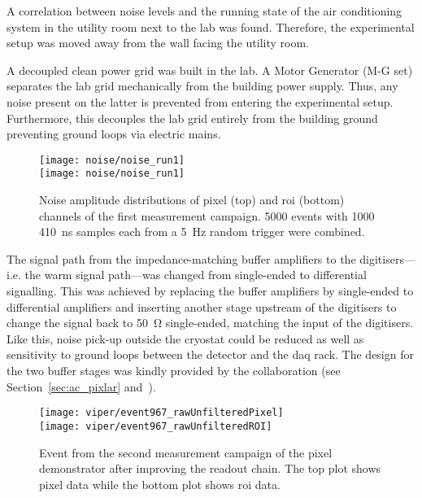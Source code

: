 A correlation between noise levels and the running state of the air conditioning system in the utility room next to the lab was found.
Therefore, the experimental setup was moved away from the wall facing the utility room.

A decoupled clean power grid was built in the lab.
A Motor Generator (M-G set) separates the lab grid mechanically from the building power supply.
Thus, any noise present on the latter is prevented from entering the experimental setup.
Furthermore, this decouples the lab grid entirely from the building ground preventing ground loops via electric mains.

\begin{figure}[htb]
	\centering
	\texttt{[image: noise/noise\_run1]} \\
	\texttt{[image: noise/noise\_run1]}
	\caption[Noise distributions from first pixel demonstrator measurement campaign]{%
		Noise amplitude distributions of pixel (top) and \acrshort{roi} (bottom) channels of the first measurement campaign.
		\num{5000} events with \num{1000} \SI{410}{\nano\second} samples each from a \SI{5}{\hertz} random trigger were combined.
	}
	\label{fig:electronics_noise-run1}
\end{figure}

The signal path from the impedance-matching buffer amplifiers to the digitisers---i.e. the warm signal path---was changed from single-ended to differential signalling.
This was achieved by replacing the buffer amplifiers by single-ended to differential amplifiers and inserting another stage upstream of the digitisers to change the signal back to \SI{50}{\ohm} single-ended, matching the input of the digitisers.
Like this, noise pick-up outside the cryostat could be reduced as well as sensitivity to ground loops between the detector and the \gls{daq} rack.
The design for the two buffer stages was kindly provided by the \lariat{} collaboration (see Section~\ref{sec:ac_pixlar} and~\cite{lariat}).

\begin{figure}[htb]
	\centering
	\texttt{[image: viper/event967\_rawUnfilteredPixel]}\\
	\texttt{[image: viper/event967\_rawUnfilteredROI]}
	\caption[Event from second pixel demonstrator measurement campaign]{%
		Event from the second measurement campaign of the pixel demonstrator after improving the readout chain.
		The top plot shows pixel data while the bottom plot shows \acrshort{roi} data.
	}
	\label{fig:electronics_event-run2}
\end{figure}

